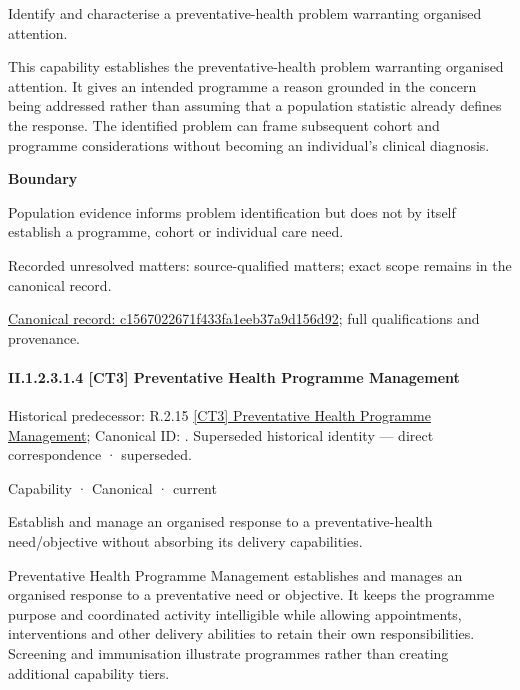 Identify and characterise a preventative-health problem warranting organised attention.



This capability establishes the preventative-health problem warranting organised attention. It gives an intended programme a reason grounded in the concern being addressed rather than assuming that a population statistic already defines the response. The identified problem can frame subsequent cohort and programme considerations without becoming an individual's clinical diagnosis.



\textbf{Boundary}



Population evidence informs problem identification but does not by itself establish a programme, cohort or individual care need.


{\small Recorded unresolved matters: source-qualified matters; exact scope remains in the canonical record.}\par
{\footnotesize \href{../../../../../../../continuum/strategy/capability/c1567022671f433fa1eeb37a9d156d92.md}{Canonical record: c1567022671f433fa1eeb37a9d156d92}; full qualifications and provenance.}\par
\paragraph*{II.1.2.3.1.4 [CT3] Preventative Health Programme Management}
\label{navigation:II.1.2.3.1.4}

{\small Historical predecessor: R.2.15 \hyperref[element:d71def9e76a544ff9761c672bb24f3be]{[CT3] Preventative Health Programme Management}; Canonical ID: \texttt{}. Superseded historical identity — direct correspondence · superseded.}\par
\label{element:563d36b179d34cb6913253d06e8d77f6}
{\small Capability · Canonical · current}\par

Establish and manage an organised response to a preventative-health need/objective without absorbing its delivery capabilities.



Preventative Health Programme Management establishes and manages an organised response to a preventative need or objective. It keeps the programme purpose and coordinated activity intelligible while allowing appointments, interventions and other delivery abilities to retain their own responsibilities. Screening and immunisation illustrate programmes rather than creating additional capability tiers.



